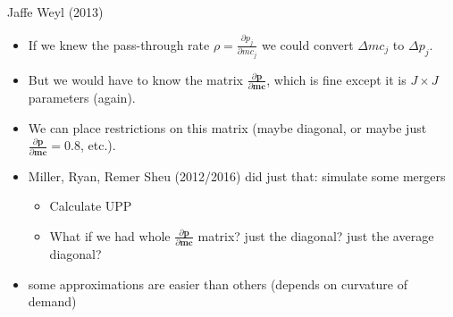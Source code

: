 \begin{frame}{Jaffe Weyl (2013)}
\begin{itemize}
\item If we knew the \alert{pass-through rate} $\rho = \frac{\partial p_j}{\partial mc_j}$ we could convert $\Delta mc_j$ to $\Delta p_j$.
\item But we would have to know the \alert{matrix} $\frac{\partial \mathbf{p}}{\partial \mathbf{mc}}$, which is fine except it is $J \times J$ parameters (again).
\item We can place restrictions on this matrix (maybe diagonal, or maybe just  $\frac{\partial \mathbf{p}}{\partial \mathbf{mc}}=0.8$, etc.).
\item Miller, Ryan, Remer Sheu (2012/2016) did just that: simulate some mergers
\begin{itemize}
    \item Calculate UPP
    \item What if we had whole $\frac{\partial \mathbf{p}}{\partial \mathbf{mc}}$ matrix? just the diagonal? just the average diagonal?
\end{itemize}
\item some approximations are easier than others (depends on curvature of demand)
\end{itemize}
\end{frame}


